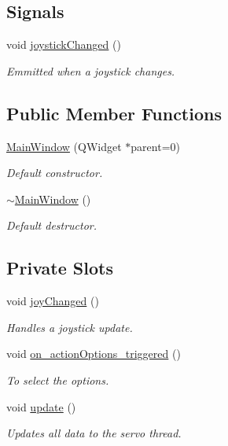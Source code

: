\subsection*{Signals}
\begin{DoxyCompactItemize}
\item 
void \hyperlink{class_main_window_ac85ba5aec3be2a51a348ff669b9dc842}{joystick\+Changed} ()
\begin{DoxyCompactList}\small\item\em Emmitted when a joystick changes. \end{DoxyCompactList}\end{DoxyCompactItemize}
\subsection*{Public Member Functions}
\begin{DoxyCompactItemize}
\item 
\hyperlink{class_main_window_a8b244be8b7b7db1b08de2a2acb9409db}{Main\+Window} (Q\+Widget $\ast$parent=0)
\begin{DoxyCompactList}\small\item\em Default constructor. \end{DoxyCompactList}\item 
\hyperlink{class_main_window_ae98d00a93bc118200eeef9f9bba1dba7}{$\sim$\+Main\+Window} ()
\begin{DoxyCompactList}\small\item\em Default destructor. \end{DoxyCompactList}\end{DoxyCompactItemize}
\subsection*{Private Slots}
\begin{DoxyCompactItemize}
\item 
void \hyperlink{class_main_window_abb4c2d8a79c9f80010ea031366bf8226}{joy\+Changed} ()
\begin{DoxyCompactList}\small\item\em Handles a joystick update. \end{DoxyCompactList}\item 
void \hyperlink{class_main_window_a1dd57ccb62bc6f5a361aba6e088dd2e1}{on\+\_\+action\+Options\+\_\+triggered} ()
\begin{DoxyCompactList}\small\item\em To select the options. \end{DoxyCompactList}\item 
void \hyperlink{class_main_window_a128f71880d4b9683149023fc46fcc9f8}{update} ()
\begin{DoxyCompactList}\small\item\em Updates all data to the servo thread. \end{DoxyCompactList}\end{DoxyCompactItemize}
